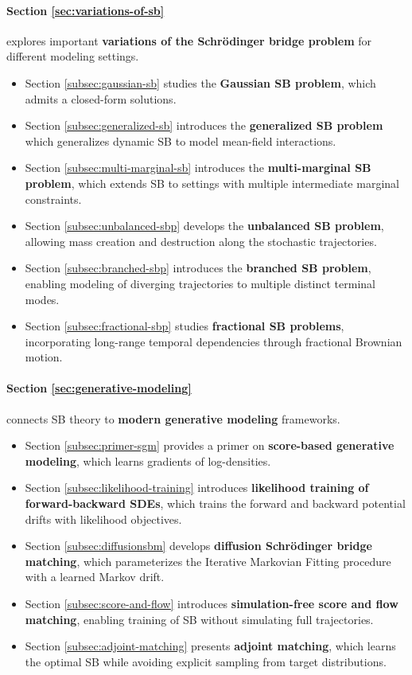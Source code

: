 \documentclass{article}
\begin{document}
\paragraph{Section \ref{sec:variations-of-sb}} explores important \textbf{variations of the Schrödinger bridge problem} for different modeling settings.
\begin{itemize}
    \item Section \ref{subsec:gaussian-sb} studies the \textbf{Gaussian SB problem}, which admits a closed-form solutions.
    \item Section \ref{subsec:generalized-sb} introduces the \textbf{generalized SB problem} which generalizes dynamic SB to model mean-field interactions.
    \item Section \ref{subsec:multi-marginal-sb} introduces the \textbf{multi-marginal SB problem}, which extends SB to settings with multiple intermediate marginal constraints.
    \item Section \ref{subsec:unbalanced-sbp} develops the \textbf{unbalanced SB problem}, allowing mass creation and destruction along the stochastic trajectories.
    \item Section \ref{subsec:branched-sbp} introduces the \textbf{branched SB problem}, enabling modeling of diverging trajectories to multiple distinct terminal modes.
    \item Section \ref{subsec:fractional-sbp} studies \textbf{fractional SB problems}, incorporating long-range temporal dependencies through fractional Brownian motion.
\end{itemize}

\paragraph{Section \ref{sec:generative-modeling}} connects SB theory to \textbf{modern generative modeling} frameworks.
\begin{itemize}
    \item Section \ref{subsec:primer-sgm} provides a primer on \textbf{score-based generative modeling}, which learns gradients of log-densities.
    \item Section \ref{subsec:likelihood-training} introduces \textbf{likelihood training of forward-backward SDEs}, which trains the forward and backward potential drifts with likelihood objectives.
    \item Section \ref{subsec:diffusionsbm} develops \textbf{diffusion Schrödinger bridge matching}, which parameterizes the Iterative Markovian Fitting procedure with a learned Markov drift. 
    \item Section \ref{subsec:score-and-flow} introduces \textbf{simulation-free score and flow matching}, enabling training of SB without simulating full trajectories.
    \item Section \ref{subsec:adjoint-matching} presents \textbf{adjoint matching}, which learns the optimal SB while avoiding explicit sampling from target distributions.
\end{itemize}
\end{document}
